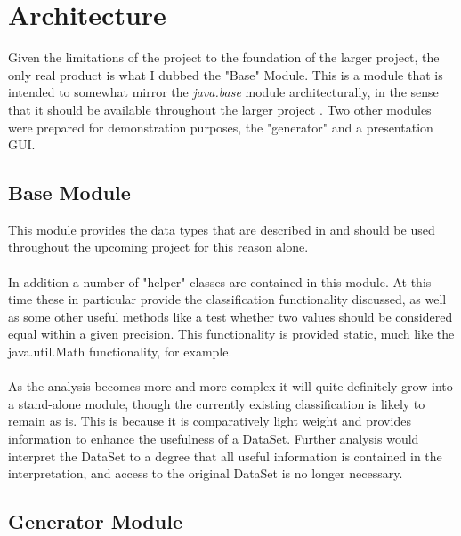 \documentclass[main.tex]{subfiles}
\begin{document}
      
  \section{Architecture}
    
    Given the limitations of the project to the foundation of the larger project, the only real product is what I dubbed the "Base" Module. This is a module that is intended to somewhat mirror the \textit{java.base} module architecturally, in the sense that it should be available throughout the larger project \cite{javaBase}. Two other modules were prepared for demonstration purposes, the "generator" and a presentation  GUI.
    
    \subsection{Base Module}
      
      This module provides the data types that are described in  and should be used throughout the upcoming project for this reason alone. 
      \\\\
      In addition a number of "helper" classes are contained in this module. At this time these in particular provide the classification functionality discussed, as well as some other useful methods like a test whether two values should be considered equal within a given precision. This functionality is provided static, much like the java.util.Math functionality, for example.
      \\\\
      As the analysis becomes more and more complex it will quite definitely grow into a stand-alone module, though the currently existing classification is likely to remain as is. This is because it is comparatively light weight and provides information to enhance the usefulness of a DataSet. Further analysis would interpret the DataSet to a degree that all useful information is contained in the interpretation, and access to the original DataSet is no longer necessary.
      
    \subsection{Generator Module}
      
\end{document}
